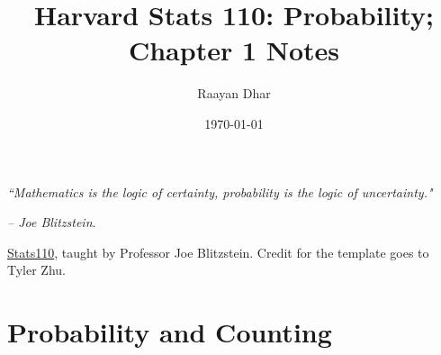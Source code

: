 \documentclass[11 pt]{scrartcl}
\begin{document}
 
\title{\Large Harvard Stats 110: Probability; Chapter 1 Notes}
\author{\large Raayan Dhar}
\date{\large\today}

\maketitle 

\begin{center}
\begin{displayquote}
    \emph{``Mathematics is the logic of certainty, probability is the logic of uncertainty."} \\ \begin{flushright} \emph{– Joe Blitzstein}.  \end{flushright}
\end{displayquote}
\end{center}


\href{https://projects.iq.harvard.edu/stat110/home}{Stats110}, taught by Professor Joe Blitzstein. Credit for the template goes to Tyler Zhu.

\tableofcontents 

\newpage

\section{Probability and Counting}
\end{document}
